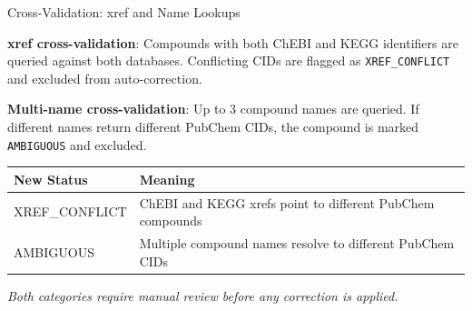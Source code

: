 \documentclass[aspectratio=169,11pt]{beamer}
\begin{document}
\begin{frame}{Cross-Validation: xref and Name Lookups}

\textbf{xref cross-validation}: Compounds with both ChEBI and KEGG
identifiers are queried against both databases. Conflicting CIDs are flagged
as \texttt{XREF\_CONFLICT} and excluded from auto-correction.

\bigskip
\textbf{Multi-name cross-validation}: Up to 3 compound names are queried.
If different names return different PubChem CIDs, the compound is marked
\texttt{AMBIGUOUS} and excluded.

\bigskip
\begin{table}[h]
\centering
\begin{tabular}{lp{7cm}}
\toprule
\textbf{New Status} & \textbf{Meaning} \\
\midrule
XREF\_CONFLICT & ChEBI and KEGG xrefs point to different PubChem compounds \\
AMBIGUOUS      & Multiple compound names resolve to different PubChem CIDs \\
\bottomrule
\end{tabular}
\end{table}

\bigskip
\footnotesize
\textit{Both categories require manual review before any correction is applied.}

\end{frame}
\end{document}

